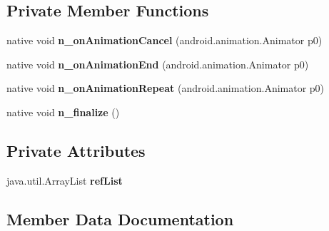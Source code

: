 \subsection*{Private Member Functions}
\begin{DoxyCompactItemize}
\item 
\mbox{\label{classmd5b60ffeb829f638581ab2bb9b1a7f4f3f_1_1GenericAnimatorListener_a9c1f1365249743e448d568880950a818}} 
native void {\bfseries n\+\_\+on\+Animation\+Cancel} (android.\+animation.\+Animator p0)
\item 
\mbox{\label{classmd5b60ffeb829f638581ab2bb9b1a7f4f3f_1_1GenericAnimatorListener_ab97205932073aa0d1cfff8ba7cf86b7b}} 
native void {\bfseries n\+\_\+on\+Animation\+End} (android.\+animation.\+Animator p0)
\item 
\mbox{\label{classmd5b60ffeb829f638581ab2bb9b1a7f4f3f_1_1GenericAnimatorListener_adec99e811e7efcf74f9846282e1ae134}} 
native void {\bfseries n\+\_\+on\+Animation\+Repeat} (android.\+animation.\+Animator p0)
\item 
\mbox{\label{classmd5b60ffeb829f638581ab2bb9b1a7f4f3f_1_1GenericAnimatorListener_a1a819466d3b0ac0f543306333f159858}} 
native void {\bfseries n\+\_\+finalize} ()
\end{DoxyCompactItemize}
\subsection*{Private Attributes}
\begin{DoxyCompactItemize}
\item 
\mbox{\label{classmd5b60ffeb829f638581ab2bb9b1a7f4f3f_1_1GenericAnimatorListener_ae2594a26cfe234349eb9ef6ff43c4d1a}} 
java.\+util.\+Array\+List {\bfseries ref\+List}
\end{DoxyCompactItemize}


\subsection{Member Data Documentation}
\mbox{\label{classmd5b60ffeb829f638581ab2bb9b1a7f4f3f_1_1GenericAnimatorListener_a2cc0ec65c1c849bc5bff6baeb2599d15}} 
